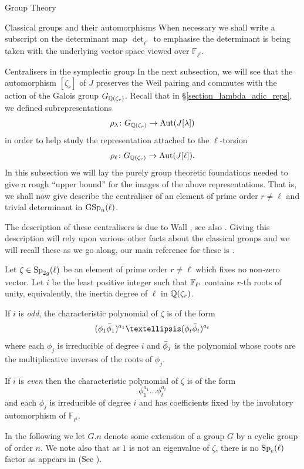 \documentclass[11pt,a4paper]{article}
\newcommand{\Fli}{\mathbb{F}_{\ell^i}}
\newcommand{\rcyclo}{\QQ(\zeta_r)}
\newcommand{\GQr}{G_{\QQ(\zeta_{r})}}
\begin{document}
\begin{section}{Group Theory}
\begin{subsection}{Classical groups and their automorphisms}
When necessary we shall write a subscript on the determinant map $\det_{\ell^i}$ to emphasise the determinant is being taken with the underlying vector space viewed over $\Fli$.
\end{subsection}
\begin{subsection}{Centralisers in the symplectic group}
\label{subsection_centralisers_in_GSp}
In the next subsection, we will see that the automorphism $[\zeta_r]$ of $J$ preserves the Weil pairing and commutes with the action of the Galois group $\GQr$.
Recall that in \S \ref{section_lambda_adic_reps}, we defined subrepresentations
\[ \rho_\lambda\colon \GQr \rightarrow \Aut(J[\lambda])
\]
in order to help study the representation attached to the $\ell$-torsion
\[\rho_\ell \colon \GQr \rightarrow \Aut(J[\ell]).
\]
In this subsection we will lay the purely group theoretic foundations needed to give a rough ``upper bound'' for the images of the above representations.
That is, we shall now give describe the centraliser of an element of prime order $r \neq \ell$ and trivial determinant in $\GSp_n(\ell)$. 


The description of these centralisers is due to Wall \cite{wall}, see also \cite[Chapter 3.4.1]{Burness}.
Giving this description will rely upon  various other facts about the classical groups and we will recall these as we go along, our main reference for these is \cite{KleidmanLiebeck}.


Let $\zeta \in \Sp_{2g}(\ell)$ be an element of prime order $r \neq \ell$ which fixes no non-zero vector. Let $i$ be the least positive integer such that $\mathbb{F}_{\ell^i}$ contains $r$-th roots of unity, equivalently, the inertia degree of $\ell$ in $\rcyclo$.


If $i$ is \emph{odd}, the characteristic polynomial of $\zeta$ is of the form
$$ (\phi_1 \Bar{\phi}_1 )^{a_1}\ldots (\phi_t \Bar{\phi}_t )^{a_t}$$
where each $\phi_j$ is irreducible of degree $i$ and $\Bar{\phi}_j$ is the polynomial whose roots are the multiplicative inverses of the roots of $\phi_j$.

If $i$ is \emph{even} then the characteristic polynomial of $\zeta$ is of the form
$$ \phi_1^{a_1}\ldots \phi_t^{a_t}$$
and each $\phi_j$ is irreducible of degree $i$ and has coefficients fixed by the involutory automorphism of $\Fli$.



In the following we let $G.n$ denote some extension of a group $G$ by a cyclic group of order $n$. We note also that as $1$ is not an eigenvalue of $\zeta$, there is no $\Sp_e(\ell)$ factor as appears in \cite{Burness} (See \cite[Prop. 3.4.3]{Burness}).


\end{subsection}
\end{section}
\end{document}

